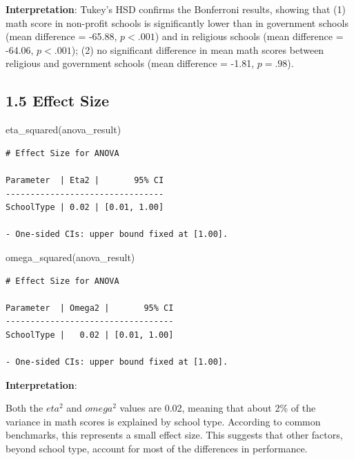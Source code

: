 \documentclass[
  letterpaper,
  DIV=11,
  numbers=noendperiod]{scrreprt}
\newenvironment{Shaded}{\begin{snugshade}}{\end{snugshade}}
\newcommand{\FunctionTok}[1]{\textcolor[rgb]{0.28,0.35,0.67}{#1}}
\newcommand{\NormalTok}[1]{\textcolor[rgb]{0.00,0.23,0.31}{#1}}
\begin{document}
\textbf{Interpretation}: Tukey's HSD confirms the Bonferroni results,
showing that (1) math score in non-profit schools is significantly lower
than in government schools (mean difference = -65.88, \(p < .001\)) and
in religious schools (mean difference = -64.06, \(p < .001\)); (2) no
significant difference in mean math scores between religious and
government schools (mean difference = -1.81, \(p = .98\)).

\subsection*{1.5 Effect Size}\label{effect-size-1}

\begin{Shaded}
\begin{Highlighting}[]
\FunctionTok{eta\_squared}\NormalTok{(anova\_result) }
\end{Highlighting}
\end{Shaded}

\begin{verbatim}
# Effect Size for ANOVA

Parameter  | Eta2 |       95% CI
--------------------------------
SchoolType | 0.02 | [0.01, 1.00]

- One-sided CIs: upper bound fixed at [1.00].
\end{verbatim}

\begin{Shaded}
\begin{Highlighting}[]
\FunctionTok{omega\_squared}\NormalTok{(anova\_result) }
\end{Highlighting}
\end{Shaded}

\begin{verbatim}
# Effect Size for ANOVA

Parameter  | Omega2 |       95% CI
----------------------------------
SchoolType |   0.02 | [0.01, 1.00]

- One-sided CIs: upper bound fixed at [1.00].
\end{verbatim}

\textbf{Interpretation}:

Both the \(eta^2\) and \(omega^2\) values are 0.02, meaning that about
2\% of the variance in math scores is explained by school type.
According to common benchmarks, this represents a small effect size.
This suggests that other factors, beyond school type, account for most
of the differences in performance.
\end{document}

